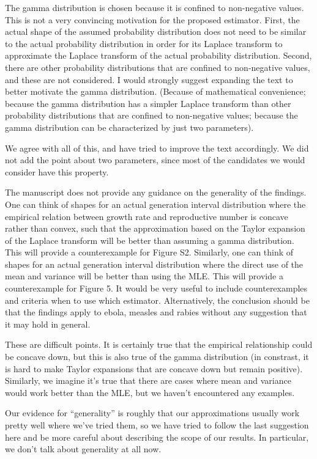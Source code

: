 \documentclass[12pt]{article}
\newcommand{\revtext}{\textsf}
\begin{document}
\revtext{The gamma distribution is chosen because it is confined to non-negative values. This is not a very convincing motivation for the proposed estimator. First, the actual shape of the assumed probability distribution does not need to be similar to the actual probability distribution in order for its Laplace transform to approximate the Laplace transform of the actual probability distribution. Second, there are other probability distributions that are confined to non-negative values, and these are not considered. I would strongly suggest expanding the text to better motivate the gamma distribution. (Because of mathematical convenience; because the gamma distribution has a simpler Laplace transform than other probability distributions that are confined to non-negative values; because the gamma distribution can be characterized by just two parameters).}

We agree with all of this, and have tried to improve the text accordingly. We did not add the point about two parameters, since most of the candidates we would consider have this property.

\revtext{The manuscript does not provide any guidance on the generality of the findings. One can think of shapes for an actual generation interval distribution where the empirical relation between growth rate and reproductive number is concave rather than convex, such that the approximation based on the Taylor expansion of the Laplace transform will be better than assuming a gamma distribution. This will provide a counterexample for Figure S2. Similarly, one can think of shapes for an actual generation interval distribution where the direct use of the mean and variance will be better than using the MLE. This will provide a counterexample for Figure 5. It would be very useful to include counterexamples and criteria when to use which estimator. Alternatively, the conclusion should be that the findings apply to ebola, measles and rabies without any suggestion that it may hold in general.}

These are difficult points. It is certainly true that the empirical relationship could be concave down, but this is also true of the gamma distribution (in constrast, it is hard to make Taylor expansions that are concave down but remain positive). Similarly, we imagine it's true that there are cases where mean and variance would work better than the MLE, but we haven't encountered any examples.

Our evidence for ``generality'' is roughly that our approximations usually work pretty well where we've tried them, so we have tried to follow the last suggestion here and be more careful about describing the scope of our results. In particular, we don't talk about generality at all now.
\end{document}
